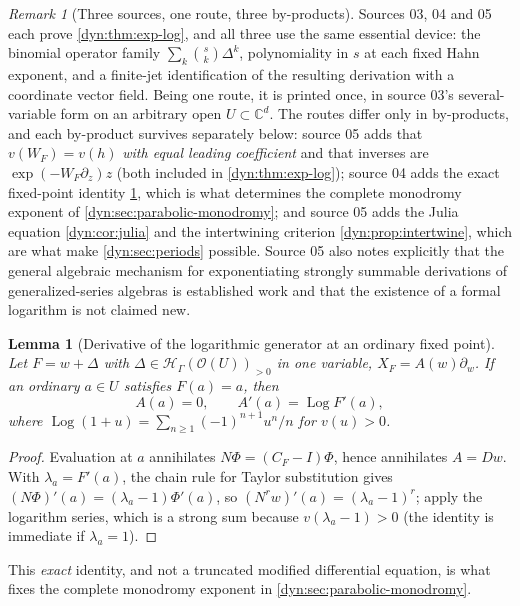 \documentclass[11pt,letterpaper]{article}
\newtheorem{lemma}[lemma]{Lemma}
\theoremstyle{definition}
\theoremstyle{remark}
\newtheorem{remark}[remark]{Remark}
\newcommand{\C}{\mathbb C}
\newcommand{\HH}{\mathscr H}
\newcommand{\OO}{\mathcal O}
\newcommand{\Log}{\operatorname{Log}}
\numberwithin{equation}{section}
\begin{document}
\begin{remark}[Three sources, one route, three by-products]
\label{dyn:rem:threelogs}
Sources 03, 04 and 05 each prove \cref{dyn:thm:exp-log}, and all three use
the same essential device: the binomial operator family
$\sum_k\binom sk\Delta^{k}$, polynomiality in $s$ at each fixed Hahn
exponent, and a finite-jet identification of the resulting derivation with
a coordinate vector field. Being one route, it is printed once, in source
03's several-variable form on an arbitrary open $U\subset\C^{d}$. The
routes differ only in by-products, and each by-product survives separately
below: source 05 adds that $v(W_F)=v(h)$ \emph{with equal leading
coefficient} and that inverses are $\exp(-W_F\partial_z)z$ (both included
in \cref{dyn:thm:exp-log}); source 04 adds the exact fixed-point identity
\cref{dyn:lem:fixedderivative}, which is what determines the complete
monodromy exponent of \cref{dyn:sec:parabolic-monodromy}; and source 05
adds the Julia equation \cref{dyn:cor:julia} and the intertwining criterion
\cref{dyn:prop:intertwine}, which are what make
\cref{dyn:sec:periods} possible. Source 05 also notes explicitly that the
general algebraic mechanism for exponentiating strongly summable
derivations of generalized-series algebras is established work
\cite{BKKPS} and that the existence of a formal logarithm is not claimed
new.
\end{remark}

\begin{lemma}[Derivative of the logarithmic generator at an ordinary fixed
point]\label{dyn:lem:fixedderivative}
Let $F=w+\Delta$ with $\Delta\in\HH_\Gamma(\OO(U))_{>0}$ in one variable,
$X_F=A(w)\partial_w$. If an ordinary $a\in U$ satisfies $F(a)=a$, then
\begin{equation}\label{dyn:eq:fixedderivative}
 A(a)=0,\qquad A'(a)=\Log F'(a),
\end{equation}
where $\Log(1+u)=\sum_{n\ge1}(-1)^{n+1}u^{n}/n$ for $v(u)>0$.
\end{lemma}
\begin{proof}
Evaluation at $a$ annihilates $N\Phi=(C_F-I)\Phi$, hence annihilates
$A=Dw$. With $\lambda_a=F'(a)$, the chain rule for Taylor substitution
gives $(N\Phi)'(a)=(\lambda_a-1)\Phi'(a)$, so
$(N^{r}w)'(a)=(\lambda_a-1)^{r}$; apply the logarithm series, which is a
strong sum because $v(\lambda_a-1)>0$ (the identity is immediate if
$\lambda_a=1$).
\end{proof}

This \emph{exact} identity, and not a truncated modified differential
equation, is what fixes the complete monodromy exponent in
\cref{dyn:sec:parabolic-monodromy}.
\end{document}
